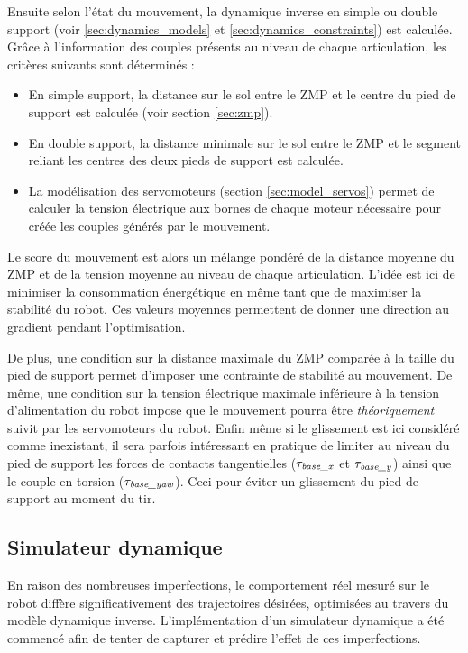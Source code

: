 Ensuite selon l'état du mouvement, la dynamique inverse en simple ou double support  
(voir \ref{sec:dynamics_models} et \ref{sec:dynamics_constraints}) est calculée.
Grâce à l'information des couples présents au niveau de chaque articulation, 
les critères suivants sont déterminés :
\begin{itemize}
    \item En simple support, la distance sur le sol entre le ZMP et 
        le centre du pied de support est calculée (voir section \ref{sec:zmp}).
    \item En double support, la distance minimale sur le sol entre le ZMP et
        le segment reliant les centres des deux pieds de support est calculée.
    \item La modélisation des servomoteurs (section \ref{sec:model_servos})
        permet de calculer la tension électrique aux bornes de chaque moteur
        nécessaire pour créée les couples générés par le mouvement.
\end{itemize}
Le score du mouvement est alors un mélange pondéré de la distance moyenne
du ZMP et de la tension moyenne au niveau de chaque articulation.
L'idée est ici de minimiser la consommation énergétique en même tant
que de maximiser la stabilité du robot.
Ces valeurs moyennes permettent de donner une direction au gradient
pendant l'optimisation.

De plus, une condition sur la distance maximale du ZMP comparée à la taille
du pied de support permet d'imposer une contrainte de stabilité au mouvement.
De même, une condition sur la tension électrique maximale inférieure à la tension 
d'alimentation du robot impose que le mouvement pourra être \textit{théoriquement} 
suivit par les servomoteurs du robot.
Enfin même si le glissement est ici considéré comme inexistant, il sera
parfois intéressant en pratique de limiter au niveau du pied de support les forces
de contacts tangentielles ($\tau_\text{\textit{base\_x}}$ et $\tau_\text{\textit{base\_y}}$) 
ainsi que le couple en torsion ($\tau_\text{\textit{base\_yaw}}$).
Ceci pour éviter un glissement du pied de support au moment du tir.

\subsection{Simulateur dynamique\label{sec:motion_simulation}}

En raison des nombreuses imperfections, le comportement réel
mesuré sur le robot diffère significativement des trajectoires 
désirées, optimisées au travers du modèle dynamique inverse.
L'implémentation d'un simulateur dynamique a été commencé afin
de tenter de capturer et prédire l'effet de ces imperfections.


